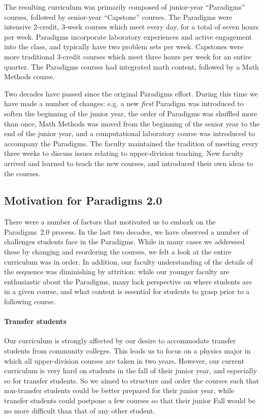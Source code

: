 \documentclass[english,aps,pra,reprint,noshowpacs,superscriptaddress]{revtex4-1}
\begin{document}
The resulting curriculum was primarily composed of junior-year
``Paradigms'' courses, followed by senior-year ``Capstone'' courses.
The Paradigms were intensive 2-credit, 3-week courses which meet every
day, for a total of seven hours per week.  Paradigms incorporate
laboratory experiences and active engagement into the class, and
typically have two problem sets per week.  Capstones were more
traditional 3-credit courses which meet three hours per week for an
entire quarter.  The Paradigms courses had integrated math content,
followed by a Math Methods course.

Two decades have passed since the original Paradigms effort.
During this time we have made a number of changes: e.g. a new
\emph{first} Paradigm was introduced to soften the beginning of the
junior year, the order of Paradigms was shuffled more than once, Math
Methods was moved from the beginning of the senior year to the end of
the junior year, and a computational laboratory course was introduced
to accompany the Paradigms.  The faculty maintained the tradition of meeting
every three weeks to discuss issues relating to upper-division
teaching.  New faculty arrived and learned to teach the new courses,
and introduced their own ideas to the courses.

\subsection{Motivation for Paradigms 2.0}
There were a number of factors that motivated us to embark on the
Paradigms~2.0 process.  In the last two decades, we have observed
a number of challenges students face in the Paradigms.  While in many cases we
addressed these by changing and reordering the courses, we felt a look
at the entire curriculum was in order.  In addition, our faculty
understanding of the details of the sequence was diminishing by attrition: 
while our younger
faculty are enthusiastic about the Paradigms, many lack perspective on
where students are in a given course, and what content is essential
for students to grasp prior to a following course.

\paragraph{Transfer students}
Our curriculum is strongly affected by our desire to accommodate
transfer students from community colleges.  This leads us to focus on
a physics major in which all upper-division courses are taken in two
years.  However, our current curriculum is very hard on students in
the fall of their junior year, and especially so for transfer
students.  So we aimed to structure and order the courses such that non-transfer
students could be better prepared for their junior year, while
transfer students could postpone a few courses so that their junior
Fall would be no more difficult than that of any other student.
\end{document}
